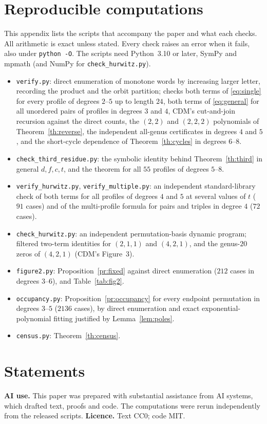 \documentclass[11pt,a4paper]{article}
\theoremstyle{definition}\newtheorem{definition}[theorem]{Definition}
\theoremstyle{remark}\newtheorem{remark}[theorem]{Remark}\newtheorem{example}[theorem]{Example}
\numberwithin{equation}{section}
\begin{document}
\section{Reproducible computations}\label{app:code}
This appendix lists the scripts that accompany the paper and what each checks. All arithmetic is exact unless stated. Every check raises an error when it fails, also under \texttt{python -O}. The scripts need Python~3.10 or later, SymPy and mpmath (and NumPy for \texttt{check\_hurwitz.py}).
\begin{itemize}
\item \texttt{verify.py}: direct enumeration of monotone words by increasing larger letter, recording the product and the orbit partition; checks both terms of \eqref{eq:single} for every profile of degrees $2$--$5$ up to length $24$, both terms of \eqref{eq:general} for all unordered pairs of profiles in degrees $3$ and $4$, CDM's cut-and-join recursion against the direct counts, the $(2,2)$ and $(2,2,2)$ polynomials of Theorem~\ref{th:reverse}, the independent all-genus certificates in degrees $4$ and $5$, and the short-cycle dependence of Theorem~\ref{th:cycles} in degrees $6$--$8$.
\item \texttt{check\_third\_residue.py}: the symbolic identity behind Theorem~\ref{th:third} in general $d,f,c,t$, and the theorem for all $55$ profiles of degrees $5$--$8$.
\item \texttt{verify\_hurwitz.py}, \texttt{verify\_multiple.py}: an independent standard-library check of both terms for all profiles of degrees $4$ and $5$ at several values of $t$ ($91$ cases) and of the multi-profile formula for pairs and triples in degree $4$ ($72$ cases).
\item \texttt{check\_hurwitz.py}: an independent permutation-basis dynamic program; filtered two-term identities for $(2,1,1)$ and $(4,2,1)$, and the genus-$20$ zeros of $(4,2,1)$ (CDM's Figure~3).
\item \texttt{figure2.py}: Proposition~\ref{pr:fixed} against direct enumeration ($212$ cases in degrees $3$--$6$), and Table~\ref{tab:fig2}.
\item \texttt{occupancy.py}: Proposition~\ref{pr:occupancy} for every endpoint permutation in degrees $3$--$5$ ($2136$ cases), by direct enumeration and exact exponential-polynomial fitting justified by Lemma~\ref{lem:poles}.
\item \texttt{census.py}: Theorem~\ref{th:census}.
\end{itemize}

\section*{Statements}
\textbf{AI use.} This paper was prepared with substantial assistance from AI systems, which drafted text, proofs and code. The computations were rerun independently from the released scripts. \textbf{Licence.} Text CC0; code MIT.
\end{document}
